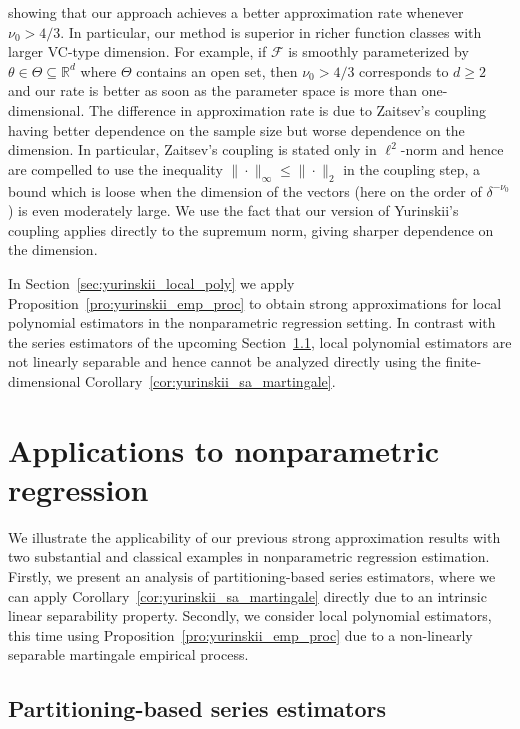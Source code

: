 \documentclass[11pt,lof]{puthesis}
\newcommand{\R}{\ensuremath{\mathbb{R}}}
\newcommand{\cF}{\ensuremath{\mathcal{F}}}
\theoremstyle{break}
\theoremstyle{proof}
\begin{document}
%
showing that our approach achieves a better approximation rate whenever
$\nu_0 > 4/3$. In particular, our method is superior in richer function classes
with larger VC-type dimension. For example, if $\cF$ is smoothly parameterized
by $\theta \in \Theta \subseteq \R^d$ where $\Theta$ contains an open set, then
$\nu_0 > 4/3$ corresponds to $d \geq 2$ and our rate is better as soon as the
parameter space is more than one-dimensional. The difference in approximation
rate is due to Zaitsev's coupling having better dependence on the sample size
but worse dependence on the dimension. In particular, Zaitsev's coupling is
stated only in $\ell^2$-norm and hence
\citet[Equation~5.3]{berthet2006revisiting} are compelled to use the inequality
$\|\cdot\|_\infty \leq \|\cdot\|_2$ in the coupling step, a bound which is
loose when the dimension of the vectors (here on the order of
$\delta^{-\nu_0}$) is even moderately large. We use the fact that our version
of Yurinskii's coupling applies directly to the supremum norm, giving sharper
dependence on the dimension.

In Section~\ref{sec:yurinskii_local_poly} we apply
Proposition~\ref{pro:yurinskii_emp_proc} to
obtain strong approximations for local polynomial estimators in the
nonparametric regression setting. In contrast with the series estimators of the
upcoming Section~\ref{sec:yurinskii_series}, local polynomial estimators are
not linearly
separable and hence cannot be analyzed directly using the finite-dimensional
Corollary~\ref{cor:yurinskii_sa_martingale}.

\section{Applications to nonparametric regression}
\label{sec:yurinskii_nonparametric}

We illustrate the applicability of our previous strong approximation results
with two substantial and classical examples in nonparametric regression
estimation. Firstly, we present an analysis of partitioning-based series
estimators, where we can apply Corollary~\ref{cor:yurinskii_sa_martingale}
directly due to an intrinsic linear separability property. Secondly, we
consider local polynomial estimators, this time using
Proposition~\ref{pro:yurinskii_emp_proc} due to a non-linearly separable
martingale empirical process.

\subsection{Partitioning-based series estimators}
\label{sec:yurinskii_series}
\end{document}
